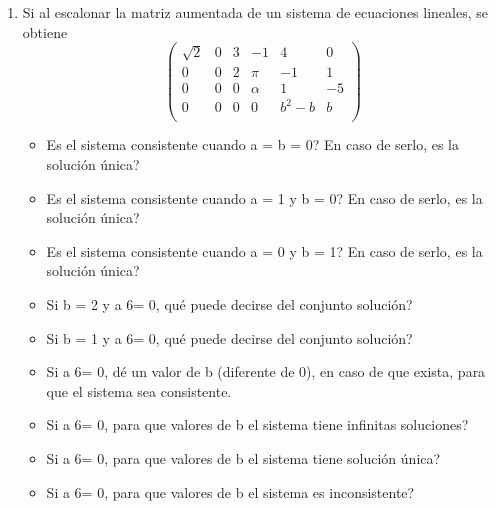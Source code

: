 \documentclass{article}
\begin{document}
\begin{enumerate}
    \item Si al escalonar la matriz aumentada de un sistema de ecuaciones lineales, se obtiene
        \[
            \left(
            \begin{array}{ccccc|c}
                \sqrt{2}    & 0        & 3        & -1       & 4        & 0 \\
                0           & 0        & 2        & \pi      & -1       & 1 \\
                0           & 0        & 0        & \alpha   & 1        & -5 \\
                0           & 0        & 0        & 0        & b^2 - b  & b \\
            \end{array}
            \right)
        \]
        \begin{itemize}
            \item Es el sistema consistente cuando a = b = 0? En caso de serlo, es la solución única?
            \item Es el sistema consistente cuando a = 1 y b = 0? En caso de serlo, es la solución única?
            \item Es el sistema consistente cuando a = 0 y b = 1? En caso de serlo, es la solución única?
            \item Si b = 2 y a 6= 0, qué puede decirse del conjunto solución?
            \item Si b = 1 y a 6= 0, qué puede decirse del conjunto solución?
            \item Si a 6= 0, dé un valor de b (diferente de 0), en caso de que exista, para que el sistema sea consistente.
            \item Si a 6= 0, para que valores de b el sistema tiene infinitas soluciones?
            \item Si a 6= 0, para que valores de b el sistema tiene solución única?
            \item Si a 6= 0, para que valores de b el sistema es inconsistente?
        \end{itemize}


\end{enumerate}
\end{document}
